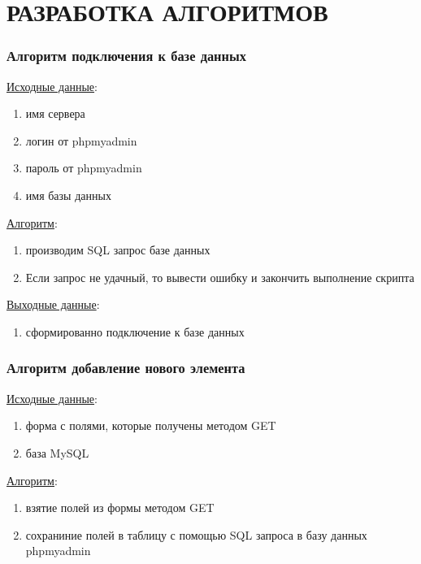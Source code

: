 \newpage
\section{РАЗРАБОТКА АЛГОРИТМОВ}

\subsubsection*{Алгоритм подключения к базе данных}

\underline{Исходные данные}:
\begin{enumerate}
    \item имя сервера
    \item логин от phpmyadmin
    \item пароль от phpmyadmin
    \item имя базы данных
\end{enumerate}

\underline{Алгоритм}:
\begin{enumerate}
    \item производим SQL запрос базе данных
    \item Если запрос не удачный, то вывести ошибку и закончить выполнение скрипта
\end{enumerate}

\underline{Выходные данные}:
\begin{enumerate}
    \item сформированно подключение к базе данных
\end{enumerate}


\subsubsection*{Алгоритм добавление нового элемента}

\underline{Исходные данные}:
\begin{enumerate}
    \item форма с полями, которые получены методом GET
    \item база MySQL
\end{enumerate}

\underline{Алгоритм}:
\begin{enumerate}
    \item взятие полей из формы методом GET
    \item сохраниние полей в таблицу с помощью SQL запроса в базу данных phpmyadmin
\end{enumerate}

